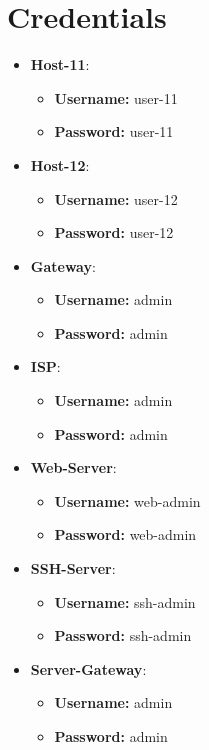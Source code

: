 \section{Credentials}
\begin{itemize}
	\item \textbf{Host-11}:
	\begin{itemize}
		\item \textbf{Username:} user-11
		\item \textbf{Password:} user-11
	\end{itemize}
	\item \textbf{Host-12}:
	\begin{itemize}
		\item \textbf{Username:} user-12
		\item \textbf{Password:} user-12
	\end{itemize}
	\item \textbf{Gateway}:
	\begin{itemize}
		\item \textbf{Username:} admin
		\item \textbf{Password:} admin
	\end{itemize}
	\item \textbf{ISP}:
	\begin{itemize}
		\item \textbf{Username:} admin
		\item \textbf{Password:} admin
	\end{itemize}
	\item \textbf{Web-Server}:
	\begin{itemize}
		\item \textbf{Username:} web-admin
		\item \textbf{Password:} web-admin
	\end{itemize}
	\item \textbf{SSH-Server}:
	\begin{itemize}
		\item \textbf{Username:} ssh-admin
		\item \textbf{Password:} ssh-admin
	\end{itemize}
	\item \textbf{Server-Gateway}:
	\begin{itemize}
		\item \textbf{Username:} admin
		\item \textbf{Password:} admin
	\end{itemize}
\end{itemize}

